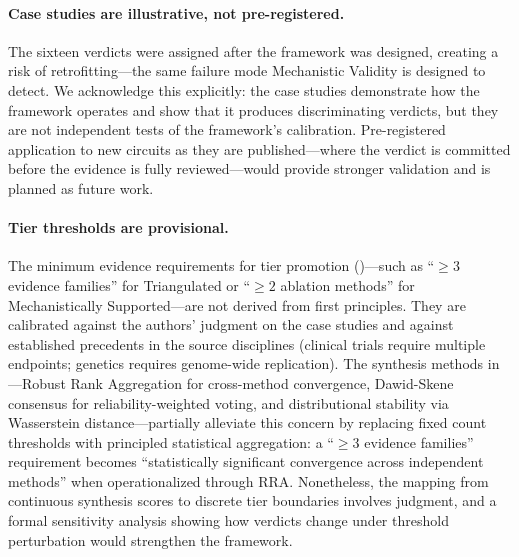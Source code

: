 \documentclass{article}
\begin{document}
\paragraph{Case studies are illustrative, not pre-registered.} The sixteen verdicts were assigned after the framework was designed, creating a risk of retrofitting---the same failure mode Mechanistic Validity is designed to detect. We acknowledge this explicitly: the case studies demonstrate how the framework operates and show that it produces discriminating verdicts, but they are not independent tests of the framework's calibration. Pre-registered application to new circuits as they are published---where the verdict is committed before the evidence is fully reviewed---would provide stronger validation and is planned as future work.

\paragraph{Tier thresholds are provisional.} The minimum evidence requirements for tier promotion ()---such as ``$\geq 3$ evidence families'' for Triangulated or ``$\geq 2$ ablation methods'' for Mechanistically Supported---are not derived from first principles. They are calibrated against the authors' judgment on the case studies and against established precedents in the source disciplines (clinical trials require multiple endpoints; genetics requires genome-wide replication). The synthesis methods in ---Robust Rank Aggregation for cross-method convergence, Dawid-Skene consensus for reliability-weighted voting, and distributional stability via Wasserstein distance---partially alleviate this concern by replacing fixed count thresholds with principled statistical aggregation: a ``$\geq 3$ evidence families'' requirement becomes ``statistically significant convergence across independent methods'' when operationalized through RRA. Nonetheless, the mapping from continuous synthesis scores to discrete tier boundaries involves judgment, and a formal sensitivity analysis showing how verdicts change under threshold perturbation would strengthen the framework.
\end{document}
